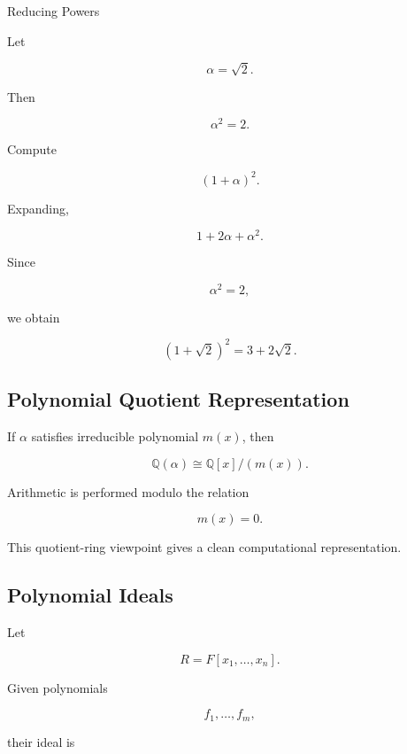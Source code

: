 \begin{workedexamplebox}{Reducing Powers}

Let

\[
\alpha=\sqrt{2}.
\]

Then

\[
\alpha^2=2.
\]

Compute

\[
(1+\alpha)^2.
\]

Expanding,

\[
1+2\alpha+\alpha^2.
\]

Since

\[
\alpha^2=2,
\]

we obtain

\begin{answerbox}
\[
\boxed{
(1+\sqrt{2})^2
=
3+2\sqrt{2}.
}
\]
\end{answerbox}

\end{workedexamplebox}

\subsection{Polynomial Quotient Representation}
\label{subsec:polynomial-quotient-representation}

If \(\alpha\) satisfies irreducible polynomial \(m(x)\), then

\[
\boxed{
\mathbb{Q}(\alpha)
\cong
\mathbb{Q}[x]/(m(x)).
}
\]

Arithmetic is performed modulo the relation

\[
\boxed{
m(x)=0.
}
\]

This quotient-ring viewpoint gives a clean computational representation.

\subsection{Polynomial Ideals}
\label{subsec:computer-algebra-polynomial-ideals}

Let

\[
R
=
F[x_1,\ldots,x_n].
\]

Given polynomials

\[
f_1,\ldots,f_m,
\]

their ideal is

